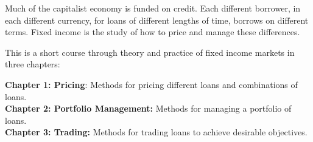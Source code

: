 
Much of the capitalist economy is funded on credit. Each different borrower, in each different currency, for loans of different lengths of time, borrows on different terms. Fixed  income is the study of how to price and manage these differences. 

This is a short course through theory and practice of fixed income markets in three chapters:


\textbf{Chapter 1: Pricing}: Methods for pricing different loans and combinations of loans.\\
\textbf{Chapter 2: Portfolio Management:} Methods for managing a portfolio of loans.\\
\textbf{Chapter 3: Trading:} Methods for trading loans to achieve desirable objectives.


